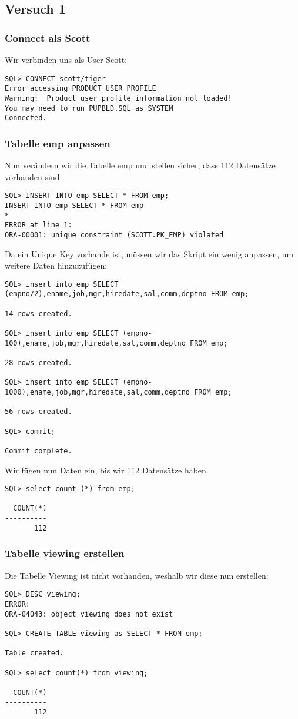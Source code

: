 \documentclass[11pt,a4paper,parskip=half]{scrartcl}
\begin{document}
\subsection{Versuch 1}
\subsubsection{Connect als Scott}
Wir verbinden uns als User Scott:
\begin{lstlisting}
SQL> CONNECT scott/tiger
Error accessing PRODUCT_USER_PROFILE
Warning:  Product user profile information not loaded!
You may need to run PUPBLD.SQL as SYSTEM
Connected.
\end{lstlisting}

\subsubsection{Tabelle emp anpassen}
Nun verändern wir die Tabelle emp und stellen sicher, dass 112 Datensätze vorhanden  sind:
\begin{lstlisting}
SQL> INSERT INTO emp SELECT * FROM emp;
INSERT INTO emp SELECT * FROM emp
*
ERROR at line 1:
ORA-00001: unique constraint (SCOTT.PK_EMP) violated
\end{lstlisting}

Da ein Unique Key vorhande ist, müssen wir das Skript ein wenig anpassen, um weitere Daten hinzuzufügen:
\begin{lstlisting}
SQL> insert into emp SELECT (empno/2),ename,job,mgr,hiredate,sal,comm,deptno FROM emp;

14 rows created.

SQL> insert into emp SELECT (empno-100),ename,job,mgr,hiredate,sal,comm,deptno FROM emp;

28 rows created.

SQL> insert into emp SELECT (empno-1000),ename,job,mgr,hiredate,sal,comm,deptno FROM emp;

56 rows created.

SQL> commit;

Commit complete.
\end{lstlisting}

Wir fügen nun Daten ein, bis wir 112 Datensätze haben.
\begin{lstlisting}
SQL> select count (*) from emp;

  COUNT(*)
----------
       112
\end{lstlisting}

\subsubsection{Tabelle viewing erstellen}
Die Tabelle Viewing ist nicht vorhanden, weshalb wir diese nun erstellen:
\begin{lstlisting}
SQL> DESC viewing;
ERROR:
ORA-04043: object viewing does not exist

SQL> CREATE TABLE viewing as SELECT * FROM emp;

Table created.

SQL> select count(*) from viewing;

  COUNT(*)
----------
       112
\end{lstlisting}
\end{document}
